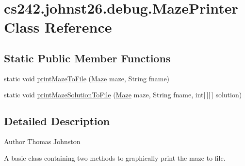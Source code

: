 \hypertarget{classcs242_1_1johnst26_1_1debug_1_1_maze_printer}{\section{cs242.\-johnst26.\-debug.\-Maze\-Printer Class Reference}
\label{classcs242_1_1johnst26_1_1debug_1_1_maze_printer}
}
\subsection*{Static Public Member Functions}
\begin{DoxyCompactItemize}
\item 
static void \hyperlink{classcs242_1_1johnst26_1_1debug_1_1_maze_printer_a7fa741e916e71791d3f7dc3d462508f4}{print\-Maze\-To\-File} (\hyperlink{interfacecs242_1_1johnst26_1_1maze_1_1_maze}{Maze} maze, String fname)
\item 
static void \hyperlink{classcs242_1_1johnst26_1_1debug_1_1_maze_printer_a8dd9c4206955ab147a82e8abc3001515}{print\-Maze\-Solution\-To\-File} (\hyperlink{interfacecs242_1_1johnst26_1_1maze_1_1_maze}{Maze} maze, String fname, int\mbox{[}$\,$\mbox{]}\mbox{[}$\,$\mbox{]} solution)
\end{DoxyCompactItemize}


\subsection{Detailed Description}
\begin{DoxyAuthor}{Author}
Thomas Johnston
\end{DoxyAuthor}
A basic class containing two methods to graphically print the maze to file. 

